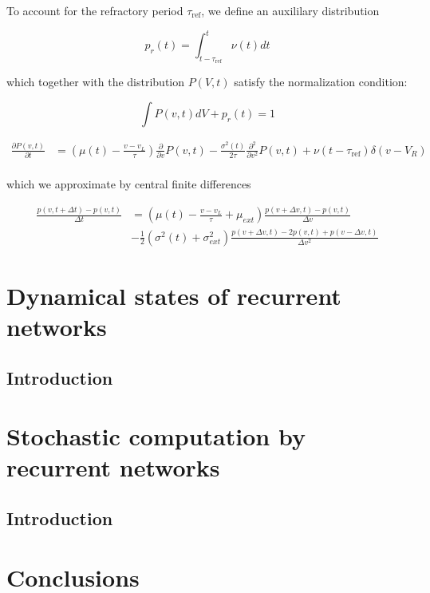 \documentclass{ucetd}
\begin{document}
To account for the refractory period $\tau_{\mathrm{ref}}$, we define an auxililary distribution

\begin{equation*}
p_{r}(t) = \int_{t-\tau_{\mathrm{ref}}}^{t} \nu(t)dt
\end{equation*}

which together with the distribution $P(V,t)$ satisfy the normalization condition:

\begin{equation*}
\int P(v,t)dV + p_{r}(t) = 1
\end{equation*}

\begin{align*}
\frac{\partial P(v,t)}{\partial t} &= \left(\mu(t) - \frac{v-v_{L}}{\tau}\right) \frac{\partial}{\partial v} P(v,t) - \frac{\sigma^{2}(t)}{2\tau}\frac{\partial^{2}}{\partial v^{2}} P(v,t) + \nu(t-\tau_{\mathrm{ref}})\delta(v-V_{R})\\
\end{align*} 


which we approximate by central finite differences

\begin{align*}
\frac{p(v, t+\Delta t) - p(v,t)}{\Delta t} &= \left(\mu(t) - \frac{v-v_{L}}{\tau}+ \mu_{ext}\right)\frac{p(v+\Delta v, t) - p(v,t)}{\Delta v} \\
&- \frac{1}{2}\left(\sigma^{2}(t) + \sigma_{ext}^{2}\right)\frac{p(v+\Delta v, t) - 2p(v,t) + p(v-\Delta v, t)}{\Delta v^{2}}
\end{align*} 


\chapter{Dynamical states of recurrent networks}
\section{Introduction}


\chapter{Stochastic computation by recurrent networks}
\section{Introduction}

\chapter{Conclusions}
\end{document}
